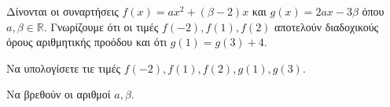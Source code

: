 Δίνονται οι συναρτήσεις $ f(x)=ax^2+\left( \beta-2\right)x $ και $ g(x)=2ax-3\beta $ όπου $ a,\beta\in\mathbb{R} $. Γνωρίζουμε ότι οι τιμές $ f(-2),f(1),f(2) $ αποτελούν διαδοχικούς όρους αριθμητικής προόδου και ότι $ g(1)=g(3)+4 $.
\begin{rlist}
\item Να υπολογίσετε τιε τιμές $ f(-2),f(1),f(2),g(1),g(3) $.
\item Να βρεθούν οι αριθμοί $ a,\beta $.
\end{rlist}